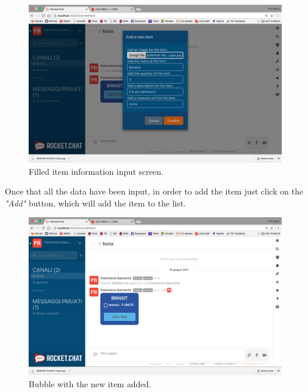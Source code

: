 \begin{figure}[H]
  \centering 
  \includegraphics[width=\textwidth]{Sections/3-HowToUse/Images/item_add_filled.png}
  \caption{Filled item information input screen.}
\end{figure}

Once that all the data have been input, in order to add the item just click on the \textit{"Add"} button, which will add the item to the list.

\begin{figure}[H]
  \centering 
  \includegraphics[width=\textwidth]{Sections/3-HowToUse/Images/item_added.png}
  \caption{Bubble with the new item added.}
\end{figure}